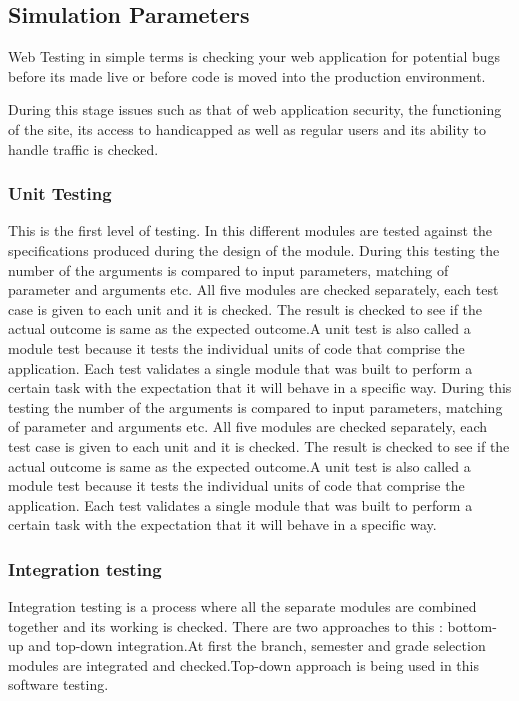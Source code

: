 \documentclass[BTech]{srmuthesis}
\begin{document}
\subsection{Simulation Parameters}
Web Testing in simple terms is checking your web application for potential bugs before its made live or before code is moved into the production environment.

During this stage issues such as that of web application security, the functioning of the site, its access to handicapped as well as regular users and its ability to handle traffic is checked.
\subsubsection{Unit Testing}
This is the first level of testing. In this different modules are tested against the specifications produced during the design of the module. During this testing the number of the arguments is compared to input parameters, matching of parameter and arguments etc. All five modules are checked separately, each test case is given to each unit and it is checked. The result is checked to see if the actual outcome is same as the expected outcome.A unit test is also called a module test because it tests the individual units of code that comprise the application. Each test validates a single module that was built to perform a certain task with the expectation that it will behave in a specific way. During this testing the number of the arguments is compared to input parameters, matching of parameter and arguments etc. All five modules are checked separately, each test case is given to each unit and it is checked. The result is checked to see if the actual outcome is same as the expected outcome.A unit test is also called a module test because it tests the individual units of code that comprise the application. Each test validates a single module that was built to perform a certain task with the expectation that it will behave in a specific way.
\subsubsection{Integration testing}
Integration testing is a process where all the separate modules are combined together
and its working is checked. There are two approaches to this : bottom-up and top-down
integration.At first the branch, semester and grade selection modules are integrated and checked.Top-down approach is being used in this software testing.
\end{document}
